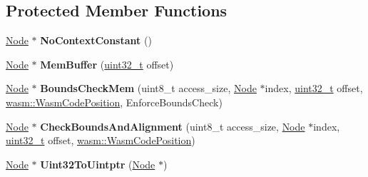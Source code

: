 \subsection*{Protected Member Functions}
\begin{DoxyCompactItemize}
\item 
\mbox{\label{classv8_1_1internal_1_1compiler_1_1WasmGraphBuilder_a9573bea640f979df0f8576621a1b01f5}} 
\mbox{\hyperlink{classv8_1_1internal_1_1compiler_1_1Node}{Node}} $\ast$ {\bfseries No\+Context\+Constant} ()
\item 
\mbox{\label{classv8_1_1internal_1_1compiler_1_1WasmGraphBuilder_a06ea4cc2658d6a1d44c04520d0c82fe3}} 
\mbox{\hyperlink{classv8_1_1internal_1_1compiler_1_1Node}{Node}} $\ast$ {\bfseries Mem\+Buffer} (\mbox{\hyperlink{classuint32__t}{uint32\+\_\+t}} offset)
\item 
\mbox{\label{classv8_1_1internal_1_1compiler_1_1WasmGraphBuilder_a5fa252d8c3856b8d41e803ce0cfa2315}} 
\mbox{\hyperlink{classv8_1_1internal_1_1compiler_1_1Node}{Node}} $\ast$ {\bfseries Bounds\+Check\+Mem} (uint8\+\_\+t access\+\_\+size, \mbox{\hyperlink{classv8_1_1internal_1_1compiler_1_1Node}{Node}} $\ast$index, \mbox{\hyperlink{classuint32__t}{uint32\+\_\+t}} offset, \mbox{\hyperlink{classint}{wasm\+::\+Wasm\+Code\+Position}}, Enforce\+Bounds\+Check)
\item 
\mbox{\label{classv8_1_1internal_1_1compiler_1_1WasmGraphBuilder_a72077cf3b8a3faccf58431e4807518d0}} 
\mbox{\hyperlink{classv8_1_1internal_1_1compiler_1_1Node}{Node}} $\ast$ {\bfseries Check\+Bounds\+And\+Alignment} (uint8\+\_\+t access\+\_\+size, \mbox{\hyperlink{classv8_1_1internal_1_1compiler_1_1Node}{Node}} $\ast$index, \mbox{\hyperlink{classuint32__t}{uint32\+\_\+t}} offset, \mbox{\hyperlink{classint}{wasm\+::\+Wasm\+Code\+Position}})
\item 
\mbox{\label{classv8_1_1internal_1_1compiler_1_1WasmGraphBuilder_a8f3401155d7dc9cefaa87d13c5e85583}} 
\mbox{\hyperlink{classv8_1_1internal_1_1compiler_1_1Node}{Node}} $\ast$ {\bfseries Uint32\+To\+Uintptr} (\mbox{\hyperlink{classv8_1_1internal_1_1compiler_1_1Node}{Node}} $\ast$)

\end{DoxyCompactItemize}
